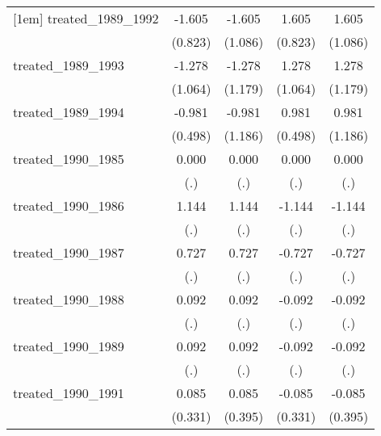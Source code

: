 {\begin{tabular}{l*{4}{c}}
[1em]
treated\_1989\_1992&      -1.605         &      -1.605         &       1.605         &       1.605         \\
            &     (0.823)         &     (1.086)         &     (0.823)         &     (1.086)         \\
[1em]
treated\_1989\_1993&      -1.278         &      -1.278         &       1.278         &       1.278         \\
            &     (1.064)         &     (1.179)         &     (1.064)         &     (1.179)         \\
[1em]
treated\_1989\_1994&      -0.981\sym{*}  &      -0.981         &       0.981\sym{*}  &       0.981         \\
            &     (0.498)         &     (1.186)         &     (0.498)         &     (1.186)         \\
[1em]
treated\_1990\_1985&       0.000         &       0.000         &       0.000         &       0.000         \\
            &         (.)         &         (.)         &         (.)         &         (.)         \\
[1em]
treated\_1990\_1986&       1.144         &       1.144         &      -1.144         &      -1.144         \\
            &         (.)         &         (.)         &         (.)         &         (.)         \\
[1em]
treated\_1990\_1987&       0.727         &       0.727         &      -0.727         &      -0.727         \\
            &         (.)         &         (.)         &         (.)         &         (.)         \\
[1em]
treated\_1990\_1988&       0.092         &       0.092         &      -0.092         &      -0.092         \\
            &         (.)         &         (.)         &         (.)         &         (.)         \\
[1em]
treated\_1990\_1989&       0.092         &       0.092         &      -0.092         &      -0.092         \\
            &         (.)         &         (.)         &         (.)         &         (.)         \\
[1em]
treated\_1990\_1991&       0.085         &       0.085         &      -0.085         &      -0.085         \\
            &     (0.331)         &     (0.395)         &     (0.331)         &     (0.395)         \\

\end{tabular}}
